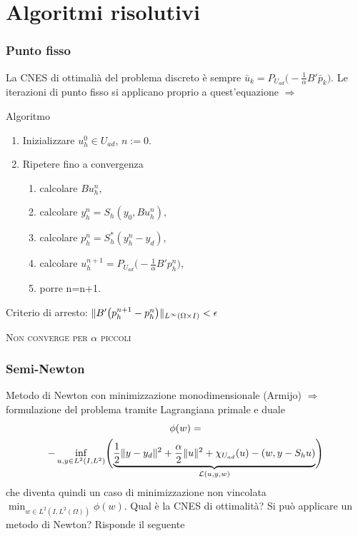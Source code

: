 \documentclass{beamer}
\theoremstyle{definition}
\theoremstyle{remark}
\theoremstyle{plain}
\theoremstyle{definition}
\DeclarePairedDelimiter{\norma}{\lVert}{\rVert}
\begin{document}
\section{Algoritmi risolutivi}
\begin{frame}
\frametitle{Punto fisso}
La CNES di ottimalià del problema discreto è sempre $ \bar{u}_k=P_{U_{ad}}\big( -\frac{1}{\alpha}B'\bar{p}_k\big) $. Le iterazioni di punto fisso si applicano proprio a quest'equazione $ \Rightarrow $
\begin{block}{Algoritmo}
\begin{enumerate}
\item Inizializzare $ u^0_h\in U_{ad} $, $ n:=0 $.
\item Ripetere fino a convergenza
          \begin{enumerate}
          \item calcolare $ Bu^n_h $,
          \item calcolare $ y^n_h=S_h(y_0,Bu^n_h) $, 
          \item calcolare $ p^n_h=S^*_h(y^n_h-y_d) $,
          \item calcolare $ u^{n+1}_h=P_{U_{ad}}\big( -\frac{1}{\alpha}B'p^n_h\big) $,
          \item porre n=n+1.
          \end{enumerate}
\end{enumerate}
Criterio di arresto: $ \norma{B'\big(p^{n+1}_h-p^n_h\big)}_{L^{\infty}(\Omega\times I)}<\epsilon $
\end{block}
{\scshape {\Large Non converge per $ \alpha $ piccoli}}
\end{frame}

\begin{frame}
\frametitle{Semi-Newton}
Metodo di Newton con minimizzazione monodimensionale (Armijo) $ \Rightarrow $ formulazione del problema tramite Lagrangiana primale e duale
\begin{multline}
\phi(w)= \\
-\inf_{u,y\in L^2(I,L^2)}\Biggl( \underbrace{\frac{1}{2}\norma{y-y_d}^2 + \frac{\alpha}{2}\norma{u}^2  + \chi_{U_{ad}}(u) - (w,y-S_hu)}_{\mathcal{L}(u,y,w)}\Biggr)
\end{multline}
che diventa quindi un caso di minimizzazione non vincolata $ \min_{w\in L^2(I,L^2(\Omega))} \phi(w) $.
Qual è la CNES di ottimalità? Si può applicare un metodo di Newton? Risponde il seguente
\end{frame}
\end{document}
